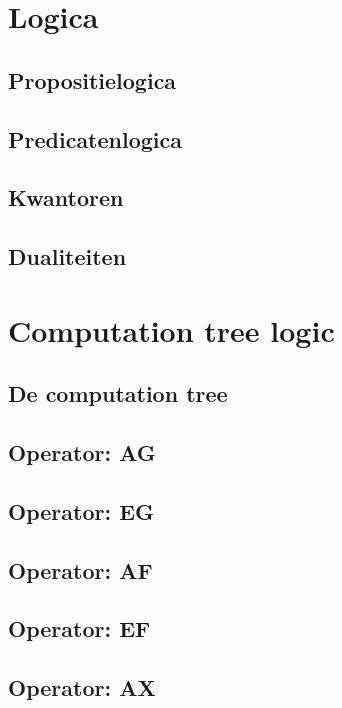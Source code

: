 \documentclass{article}
\begin{document}
\section{Logica}

\subsection{Propositielogica}

\subsection{Predicatenlogica}

\subsection{Kwantoren}

\subsection{Dualiteiten}

\section{Computation tree logic}

\subsection{De computation tree}

\subsection{Operator: AG}

\subsection{Operator: EG}

\subsection{Operator: AF}

\subsection{Operator: EF}

\subsection{Operator: AX}
\end{document}
